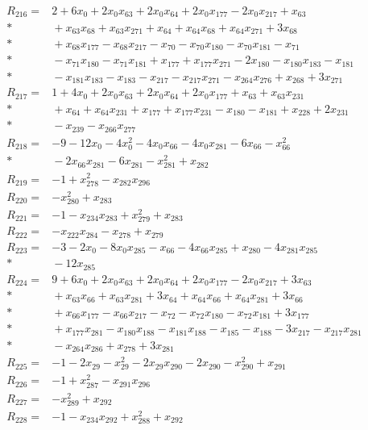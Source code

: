 \begin{align*}
R_{216}={}&2+6x_{0}+2x_{0}x_{63}+2x_{0}x_{64}+2x_{0}x_{177}-2x_{0}x_{217}+x_{63}\\*
&{}+x_{63}x_{68}+x_{63}x_{271}+x_{64}+x_{64}x_{68}+x_{64}x_{271}+3x_{68}\\*
&{}+x_{68}x_{177}-x_{68}x_{217}-x_{70}-x_{70}x_{180}-x_{70}x_{181}-x_{71}\\*
&{}-x_{71}x_{180}-x_{71}x_{181}+x_{177}+x_{177}x_{271}-2x_{180}-x_{180}x_{183}-x_{181}\\*
&{}-x_{181}x_{183}-x_{183}-x_{217}-x_{217}x_{271}-x_{264}x_{276}+x_{268}+3x_{271}\\[3pt]
R_{217}={}&1+4x_{0}+2x_{0}x_{63}+2x_{0}x_{64}+2x_{0}x_{177}+x_{63}+x_{63}x_{231}\\*
&{}+x_{64}+x_{64}x_{231}+x_{177}+x_{177}x_{231}-x_{180}-x_{181}+x_{228}+2x_{231}\\*
&{}-x_{239}-x_{266}x_{277}\\[3pt]
R_{218}={}&-9-12x_{0}-4x_{0}^{2}-4x_{0}x_{66}-4x_{0}x_{281}-6x_{66}-x_{66}^{2}\\*
&{}-2x_{66}x_{281}-6x_{281}-x_{281}^{2}+x_{282}\\[3pt]
R_{219}={}&-1+x_{278}^{2}-x_{282}x_{296}\\[3pt]
R_{220}={}&-x_{280}^{2}+x_{283}\\[3pt]
R_{221}={}&-1-x_{234}x_{283}+x_{279}^{2}+x_{283}\\[3pt]
R_{222}={}&-x_{222}x_{284}-x_{278}+x_{279}\\[3pt]
R_{223}={}&-3-2x_{0}-8x_{0}x_{285}-x_{66}-4x_{66}x_{285}+x_{280}-4x_{281}x_{285}\\*
&{}-12x_{285}\\[3pt]
R_{224}={}&9+6x_{0}+2x_{0}x_{63}+2x_{0}x_{64}+2x_{0}x_{177}-2x_{0}x_{217}+3x_{63}\\*
&{}+x_{63}x_{66}+x_{63}x_{281}+3x_{64}+x_{64}x_{66}+x_{64}x_{281}+3x_{66}\\*
&{}+x_{66}x_{177}-x_{66}x_{217}-x_{72}-x_{72}x_{180}-x_{72}x_{181}+3x_{177}\\*
&{}+x_{177}x_{281}-x_{180}x_{188}-x_{181}x_{188}-x_{185}-x_{188}-3x_{217}-x_{217}x_{281}\\*
&{}-x_{264}x_{286}+x_{278}+3x_{281}\\[3pt]
R_{225}={}&-1-2x_{29}-x_{29}^{2}-2x_{29}x_{290}-2x_{290}-x_{290}^{2}+x_{291}\\[3pt]
R_{226}={}&-1+x_{287}^{2}-x_{291}x_{296}\\[3pt]
R_{227}={}&-x_{289}^{2}+x_{292}\\[3pt]
R_{228}={}&-1-x_{234}x_{292}+x_{288}^{2}+x_{292}\\[3pt]

\end{align*}
